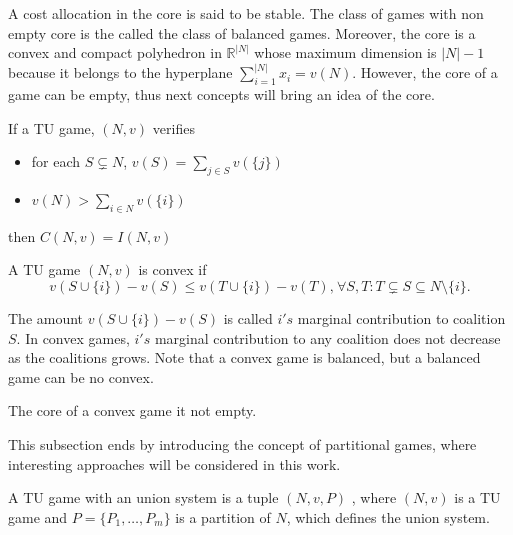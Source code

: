 A cost allocation in the core is said to be stable. The class of games with non empty core is the called the class of balanced games.
Moreover, the core is a convex and compact polyhedron in $\mathbb{R}^{|N|}$ whose maximum dimension is $|N|-1$ because it belongs to the hyperplane $\sum_{i=1}^{|N|}x_{i}=v(N)$. However, the core of a game can be empty, thus next concepts will bring an idea of the core.

\begin{proposition}
	If a TU game, $(N,v)$ verifies
	\begin{itemize}
		\item for each $S \subsetneq N$, $v(S) = \sum_{j \in S} v(\{j\})$
		\item $v(N) > \sum_{i \in N} v(\{i\}) $
	\end{itemize}
	then $C(N,v)= I(N,v)$
\end{proposition}

\begin{definition}
	A TU game $(N,v)$ is convex if
	$$v(S \cup \{i\} )- v(S) \leq v(T \cup \{i\} )- v(T), \hspace{1pt}\forall S, T: T \subsetneq S \subseteq N \setminus \{i\}.$$
\end{definition}

The amount $v(S \cup \{i\} )- v(S) $ is called $i's$ marginal contribution to coalition $S$. In convex games, $i's$ marginal contribution to any coalition does not decrease as the coalitions grows. Note that a convex game is balanced, but a balanced game can be no convex.

\begin{proposition}
	The core of a convex game it not empty.
	
\end{proposition}	



This subsection ends by introducing the concept of partitional games, where interesting approaches will be considered in this work. 

\begin{definition}
	A TU game with an union system is a tuple $(N,v,P)$ , where $(N,v)$ is a TU game and $P=\{P_{1}, \dots, P_m\}$ is a partition of $N$, which defines the union system.
\end{definition}

